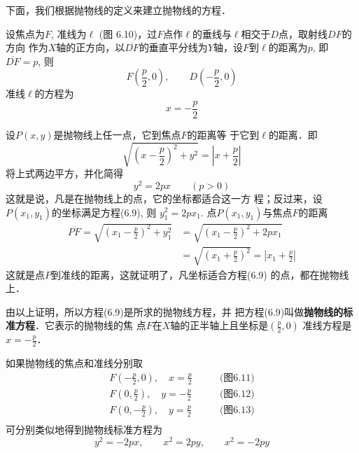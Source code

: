下面，我们根据抛物线的定义来建立抛物线的方程．

\begin{figure}[htp]
    \centering
{}
    \caption{}
\end{figure}

设焦点为$F$, 准线为$\ell$ (图
6.10)，过$F$点作$\ell$的垂线与$\ell$相交于$D$点，取射线$DF$的方向
作为$X$轴的正方向，以$\overline{DF}$的垂直平分线为$Y$轴，设$F$到$\ell$的距离为$p$, 即$\overline{DF}=p$, 则
\[F\left(\frac{p}{2},0\right),\qquad D\left(-\frac{p}{2},0\right)\]
准线$\ell$的方程为
\[x=-\frac{p}{2}\]

设$P(x,y)$是抛物线上任一点，它到焦点$F$的距离等
于它到$\ell$的距离．即
\[\sqrt{\left(x-\frac{p}{2}\right)^2+y^2}=\left|x+\frac{p}{2}\right|\]
将上式两边平方，并化简得
\begin{equation}
    y^2=2px\qquad (p>0)
\end{equation}
这就是说，凡是在抛物线上的点，它的坐标都适合这一方
程；反过来，设$P(x_1,y_1)$的坐标满足方程(6.9), 则
$y_1^2=2px_1$. 点$P(x_1,y_1)$与焦点$F$的距离
\[\begin{split}
    \overline{PF}=\sqrt{\left(x_1-\frac{p}{2}\right)^2+y^2_1}&=\sqrt{\left(x_1-\frac{p}{2}\right)^2+2px_1}\\
    &=\sqrt{\left(x_1+\frac{p}{2}\right)^2}=\left|x_1+\frac{p}{2}\right|
\end{split}\]
这就是点$P$到准线的距离，这就证明了，凡坐标适合方程(6.9)
的点，都在抛物线上．

由以上证明，所以方程(6.9)是所求的抛物线方程，并
把方程(6.9)叫做\textbf{抛物线的标准方程}．它表示的抛物线的焦
点$F$在$X$轴的正半轴上且坐标是$\left(\frac{p}{2},0\right)$
准线方程是$x=-\frac{p}{2}$．

如果抛物线的焦点和准线分别取
\[\begin{split}
F\left(-\frac{p}{2},0\right),\quad x=\frac{p}{2}&\qquad \text{(图6.11)}\\
F\left(0,\frac{p}{2}\right),\quad y=-\frac{p}{2}&\qquad \text{(图6.12)}\\
F\left(0,-\frac{p}{2}\right),\quad y=\frac{p}{2}&\qquad \text{(图6.13)}\\
\end{split}\]
可分别类似地得到抛物线标准方程为
\[y^2=-2px,\qquad x^2=2py,\qquad x^2=-2py\]

